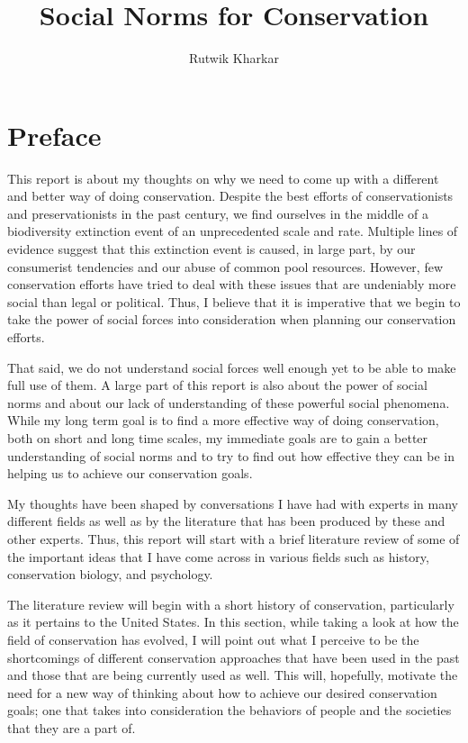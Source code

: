 \documentclass{report}
\title{Social Norms for Conservation}
\author{Rutwik Kharkar}
\begin{document}
\maketitle

\chapter*{Preface}

This report is about my thoughts on why we need to come up with a different and better way of doing conservation. Despite the best efforts of conservationists and preservationists in the past century, we find ourselves in the middle of a biodiversity extinction event of an unprecedented scale and rate. Multiple lines of evidence suggest that this extinction event is caused, in large part, by our consumerist tendencies and our abuse of common pool resources. However, few conservation efforts have tried to deal with these issues that are undeniably more social than legal or political. Thus, I believe that it is imperative that we begin to take the power of social forces into consideration when planning our conservation efforts.

That said, we do not understand social forces well enough yet to be able to make full use of them. A large part of this report is also about the power of social norms and about our lack of understanding of these powerful social phenomena. While my long term goal is to find a more effective way of doing conservation, both on short and long time scales, my immediate goals are to gain a better understanding of social norms and to try to find out how effective they can be in helping us to achieve our conservation goals.

My thoughts have been shaped by conversations I have had with experts in many different fields as well as by the literature that has been produced by these and other experts. Thus, this report will start with a brief literature review of some of the important ideas that I have come across in various fields such as history, conservation biology, and psychology.

The literature review will begin with a short history of conservation, particularly as it pertains to the United States. In this section, while taking a look at how the field of conservation has evolved, I will point out what I perceive to be the shortcomings of different conservation approaches that have been used in the past and those that are being currently used as well. This will, hopefully, motivate the need for a new way of thinking about how to achieve our desired conservation goals; one that takes into consideration the behaviors of people and the societies that they are a part of.
\end{document}
